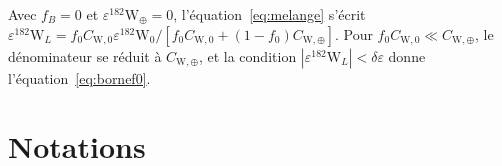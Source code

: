 \documentclass[11pt,a4paper,openany]{report}
\begin{document}
Avec $f_B=0$ et $\varepsilon^{182}\mathrm{W}_\oplus=0$, l'équation~\eqref{eq:melange} s'écrit
$\varepsilon^{182}\mathrm{W}_L=f_0C_{\mathrm{W},0}\varepsilon^{182}\mathrm{W}_0/
[f_0C_{\mathrm{W},0}+(1-f_0)C_{\mathrm{W},\oplus}]$. Pour $f_0C_{\mathrm{W},0}\ll C_{\mathrm{W},\oplus}$,
le dénominateur se réduit à $C_{\mathrm{W},\oplus}$, et la condition
$|\varepsilon^{182}\mathrm{W}_L|<\delta\varepsilon$ donne l'équation~\eqref{eq:bornef0}.

\chapter{Notations}
\label{app:notations}
\end{document}
